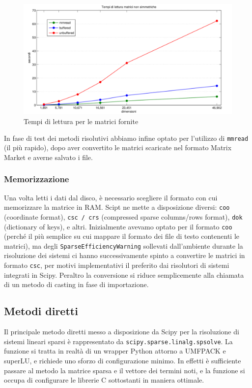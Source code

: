 \documentclass[11pt,a4paper]{scrartcl}
\begin{document}
\begin{figure}[!ht]
\centering
\includegraphics[scale=0.51]{images/lettura} 
\caption{Tempi di lettura per le matrici fornite}
\label{lettura}
\end{figure}

In fase di test dei metodi risolutivi abbiamo infine optato per l'utilizzo di \texttt{mmread} (il più rapido), dopo aver convertito le matrici scaricate nel formato Matrix Market e averne salvato i file.

\subsubsection*{Memorizzazione}

Una volta letti i dati dal disco, è necessario scegliere il formato con cui memorizzare la matrice in RAM. Scipt ne mette a disposizione diversi: \texttt{coo} (coordinate format), \texttt{csc / crs} (compressed sparse columns/rows format), \texttt{dok} (dictionary of keys), e altri. Inizialmente avevamo optato per il formato \texttt{coo} (perché il più semplice su cui mappare il formato dei file di testo contenenti le matrici), ma degli \texttt{SparseEfficiencyWarning} sollevati dall'ambiente durante la risoluzione dei sistemi ci hanno successivamente spinto a convertire le matrici in formato \texttt{csc}, per motivi implementativi il preferito dai risolutori di sistemi integrati in Scipy. Peraltro la conversione si riduce semplicemente alla chiamata di un metodo di casting in fase di importazione.

\subsection*{Metodi diretti}
Il principale metodo diretti messo a disposizione da Scipy per la risoluzione di sistemi lineari sparsi è rappresentato da \texttt{scipy.sparse.linalg.spsolve}. La funzione si tratta in realtà di un wrapper Python attorno a UMFPACK e superLU, e richiede uno sforzo di configurazione minimo. In effetti è sufficiente passare al metodo la matrice sparsa e il vettore dei termini noti, e la funzione si occupa di configurare le librerie C sottostanti in maniera ottimale.
\end{document}

